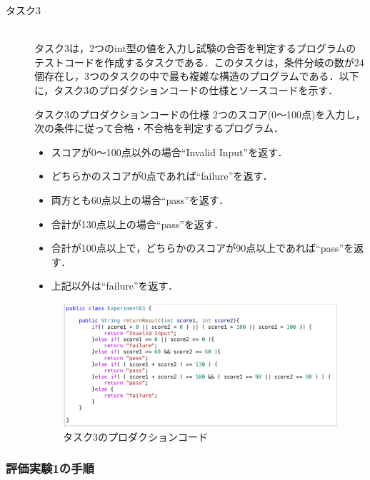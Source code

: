 \documentclass[12pt]{jarticle} %
\begin{document}
\begin{description}
\item[タスク3]~\\
タスク3は，2つのint型の値を入力し試験の合否を判定するプログラムのテストコードを作成するタスクである．このタスクは，条件分岐の数が24個存在し，3つのタスクの中で最も複雑な構造のプログラムである．以下に，タスク3のプロダクションコードの仕様とソースコードを示す．

\begin{itembox}[l]{タスク3のプロダクションコードの仕様}
2つのスコア(0～100点)を入力し，次の条件に従って合格・不合格を判定するプログラム．
\begin{itemize}
\item スコアが0～100点以外の場合``Invalid Input''を返す．
\item どちらかのスコアが0点であれば``failure''を返す．
\item 両方とも60点以上の場合``pass''を返す．
\item 合計が130点以上の場合``pass''を返す．
\item 合計が100点以上で，どちらかのスコアが90点以上であれば``pass''を返す．
\item 上記以外は``failure''を返す．
\end{itemize}
\end{itembox}


\begin{figure}[htbp]
  \begin{center}
    \includegraphics[clip,width=15cm]{E3.pdf}
    \caption{タスク3のプロダクションコード}
    \label{E3}
  \end{center}
\end{figure}

\end{description}

\subsubsection{評価実験1の手順}
\end{document}
